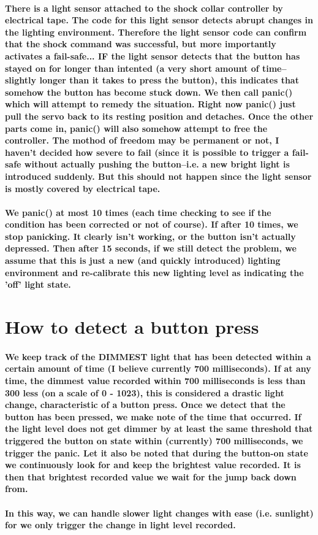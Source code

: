 \documentclass[10pt,a4paper]{article}
\begin{document}
\paragraph{There is a light sensor attached to the shock collar controller by electrical tape. The code for this light sensor detects abrupt changes in the lighting environment. Therefore the light sensor code can confirm that the shock command was successful, but more importantly activates a fail-safe... IF the light sensor detects that the button has stayed on for longer than intented (a very short amount of time--slightly longer than it takes to press the button), this indicates that somehow the button has become stuck down. We then call panic() which will attempt to remedy the situation. Right now panic() just pull the servo back to its resting position and detaches. Once the other parts come in, panic() will also somehow attempt to free the controller. The mothod of freedom may be permanent or not, I haven't decided how severe to fail (since it is possible to trigger a fail-safe without actually pushing the button--i.e. a new bright light is introduced suddenly. But this should not happen since the light sensor is mostly covered by electrical tape.
}
\paragraph{We panic() at most 10 times (each time checking to see if the condition has been corrected 
   or not of course). If after 10 times, we stop panicking. It clearly isn't working, or the
   button isn't actually depressed. Then after 15 seconds, if we still detect the problem, we
   assume that this is just a new (and quickly introduced) lighting environment and re-calibrate
   this new lighting level as indicating the 'off' light state.}   
   
\section{How to detect a button press}
\paragraph{We keep track of the DIMMEST light that has been detected within a certain amount of time (I believe currently 700 milliseconds). If at any time, the dimmest value recorded within 700 milliseconds is less than 300 less (on a scale of 0 - 1023), this is considered a drastic light change, characteristic of a button press. Once we detect that the button has been pressed, we make note of the time that occurred. If the light level does not get dimmer by at least the same threshold that triggered the button on state within (currently) 700 milliseconds, we trigger the panic. Let it also be noted that during the button-on state we continuously look for and keep the brightest value recorded. It is then that brightest recorded value we wait for the jump back down from.}
\paragraph{In this way, we can handle slower light changes with ease (i.e. sunlight) for we only trigger the change in light level recorded.} 
\end{document}
